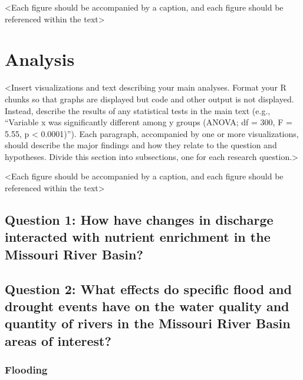 \documentclass[12pt,]{article}
\begin{document}
\textless{}Each figure should be accompanied by a caption, and each
figure should be referenced within the text\textgreater{}

\newpage

\hypertarget{analysis}{%
\section{Analysis}\label{analysis}}

\textless{}Insert visualizations and text describing your main analyses.
Format your R chunks so that graphs are displayed but code and other
output is not displayed. Instead, describe the results of any
statistical tests in the main text (e.g., ``Variable x was significantly
different among y groups (ANOVA; df = 300, F = 5.55, p \textless{}
0.0001)''). Each paragraph, accompanied by one or more visualizations,
should describe the major findings and how they relate to the question
and hypotheses. Divide this section into subsections, one for each
research question.\textgreater{}

\textless{}Each figure should be accompanied by a caption, and each
figure should be referenced within the text\textgreater{}

\hypertarget{question-1-how-have-changes-in-discharge-interacted-with-nutrient-enrichment-in-the-missouri-river-basin}{%
\subsection{Question 1: How have changes in discharge interacted with
nutrient enrichment in the Missouri River
Basin?}\label{question-1-how-have-changes-in-discharge-interacted-with-nutrient-enrichment-in-the-missouri-river-basin}}

\hypertarget{question-2-what-effects-do-specific-flood-and-drought-events-have-on-the-water-quality-and-quantity-of-rivers-in-the-missouri-river-basin-areas-of-interest}{%
\subsection{Question 2: What effects do specific flood and drought
events have on the water quality and quantity of rivers in the Missouri
River Basin areas of
interest?}\label{question-2-what-effects-do-specific-flood-and-drought-events-have-on-the-water-quality-and-quantity-of-rivers-in-the-missouri-river-basin-areas-of-interest}}

\hypertarget{flooding}{%
\subsubsection{Flooding}\label{flooding}}
\end{document}
